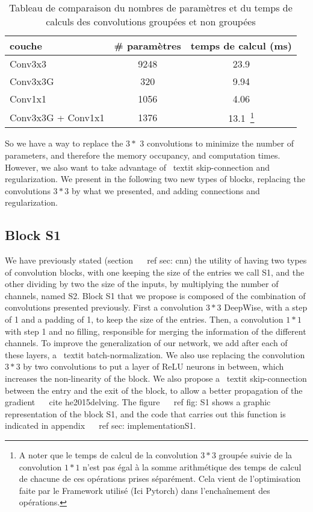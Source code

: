 \documentclass[letterpaper, 10 pt, conference]{ieeeconf}  %
\begin{document}
\begin{table}[!htb]
\centering
\begin{tabular}{|l|c|c|}
\hline
couche & \# paramètres & temps de calcul (ms) \\
\hline
\hline
Conv3x3 & 9248 & 23.9 \\
\hline
Conv3x3G & 320 & 9.94\\
\hline
Conv1x1 & 1056 & 4.06\\
\hline
Conv3x3G + Conv1x1 & 1376 & 13.1~\footnote{A noter que le temps de calcul de la convolution $3*3$ groupée suivie de la convolution $1*1$ n'est pas égal à la somme arithmétique des temps de calcul de chacune de ces opérations prises séparément. Cela vient de l'optimisation faite par le Framework utilisé (Ici Pytorch) dans l'enchaînement des opérations.} \\
\hline
\end{tabular}
\caption{Tableau de comparaison du nombres de paramètres et du temps de calculs des convolutions groupées et non groupées}
\label{tab:convG}
\end{table}

So we have a way to replace the $ 3 * $ 3 convolutions to minimize the number of parameters, and therefore the memory occupancy, and computation times.
However, we also want to take advantage of \ textit {skip-connection} and regularization.
We present in the following two new types of blocks, replacing the convolutions $ 3 * 3 $ by what we presented, and adding connections and regularization.


\subsection {Block S1}
\label{sec:S1}


We have previously stated (section ~ \ ref {sec: cnn}) the utility of having two types of convolution blocks, with one keeping the size of the entries we call S1, and the other dividing by two the size of the inputs, by multiplying the number of channels, named S2.
Block S1 that we propose is composed of the combination of convolutions presented previously.
First a convolution $ 3 * 3 $ DeepWise, with a step of 1 and a padding of 1, to keep the size of the entries.
Then, a convolution $ 1 * 1 $ with step 1 and no filling, responsible for merging the information of the different channels.
To improve the generalization of our network, we add after each of these layers, a \ textit {batch-normalization}.
We also use replacing the convolution $ 3 * 3 $ by two convolutions to put a layer of ReLU neurons in between, which increases the non-linearity of the block.
We also propose a \ textit {skip-connection} between the entry and the exit of the block, to allow a better propagation of the gradient ~ \ cite {he2015delving}.
The figure ~ \ ref {fig: S1} shows a graphic representation of the block S1, and the code that carries out this function is indicated in appendix ~ \ ref {sec: implementationS1}.
\end{document}
